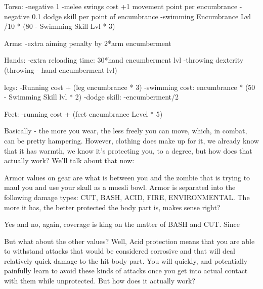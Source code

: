 \documentclass[11pt]{report}
\begin{document}
Torso:
-negative 1%
-melee swings cost +1 movement point per encumbrance
-negative 0.1 dodge skill per point of encumbrance
-swimming Encumbrance Lvl /10 * (80 - Swimming Skill Lvl * 3)

Arms:
-extra aiming penalty by 2*arm encumberment

Hands:
-extra reloading time: 30*hand encumberment lvl
-throwing dexterity (throwing - hand encumberment lvl)

legs:
-Running cost + (leg encumbrance * 3)
-swimming cost: encumbrance * (50 - Swimming Skill lvl * 2)
-dodge skill: -encumberment/2

Feet:
-running cost + (feet encumbrance Level * 5)

Basically - the more you wear, the less freely you can move, which, in combat, can be pretty hampering. However, clothing does make up for it, we already know that it has warmth, we know it's protecting you, to a degree, but how does that actually work? We'll talk about that now:

Armor values on gear are what is between you and the zombie that is trying to maul you and use your skull as a muesli bowl. Armor is separated into the following damage types: CUT, BASH, ACID, FIRE, ENVIRONMENTAL. The more it has, the better protected the body part is, makes sense right?

Yes and no, again, coverage is king on the matter of BASH and CUT. Since %

But what about the other values? Well, Acid protection means that you are able to withstand attacks that would be considered corrosive and that will deal relatively quick damage to the hit body part. You will quickly, and potentially painfully learn to avoid these kinds of attacks once you get into actual contact with them while unprotected. But how does it actually work?
\end{document}
